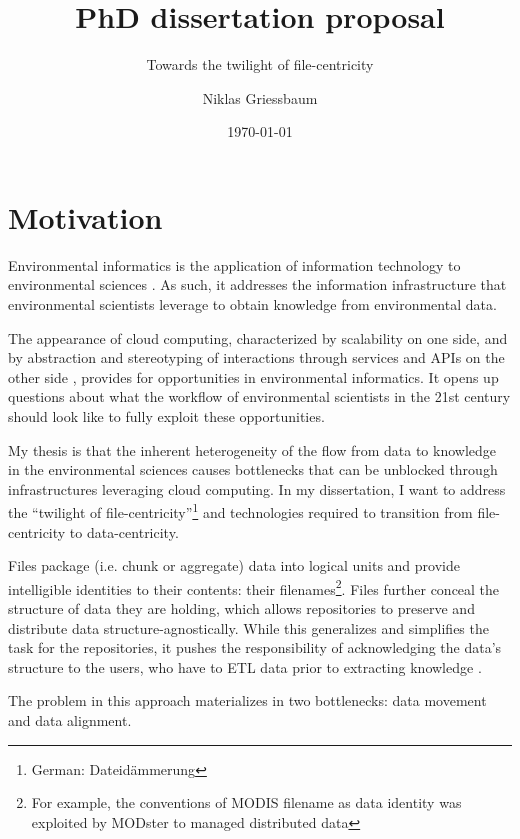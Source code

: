 \documentclass[letterpaper, parskip=half]{scrartcl}
\title{PhD dissertation proposal}
\subtitle{Towards the twilight of file-centricity}
\author{Niklas Griessbaum}
\date{\today}
\begin{document}
\maketitle

\newpage
\tableofcontents

\newpage
\printglossaries


\newpage

\section{Motivation}

Environmental informatics is the application of information technology to environmental sciences \citep{Frew2012}.
As such, it addresses the information infrastructure that environmental scientists leverage
to obtain knowledge from environmental data.

The appearance of cloud computing, characterized by scalability on one side, 
and by abstraction and stereotyping of interactions through services and \glspl{API} on the other side \citep{Foster2017}, 
provides for opportunities in environmental informatics. 
It opens up questions about what the workflow of environmental scientists in the 21st century should look like to fully exploit these opportunities.

My thesis is that the inherent heterogeneity of the flow from data to knowledge in the environmental sciences causes bottlenecks that can be unblocked through infrastructures leveraging cloud computing. 
In my dissertation, I want to address the ``twilight of file-centricity''\footnote{German: Dateidämmerung } and technologies required to transition from file-centricity to data-centricity.

Files package (i.e. chunk or aggregate) data into logical units and provide intelligible identities to their contents: their filenames\footnote{For example, the conventions of \gls{MODIS} filename as data identity was exploited by MODster \citep{Frew2005, Frew2002} to managed distributed data}.
Files further conceal the structure of data they are holding, which allows repositories to preserve and distribute data structure-agnostically. 
While this generalizes and simplifies the task for the repositories, it pushes the responsibility of acknowledging the data's structure to the users, who have to \gls{ETL} data prior to extracting knowledge \citep{Rilee2016, Szalay2009}.

The problem in this approach materializes in two bottlenecks: data movement and data alignment.
\end{document}
